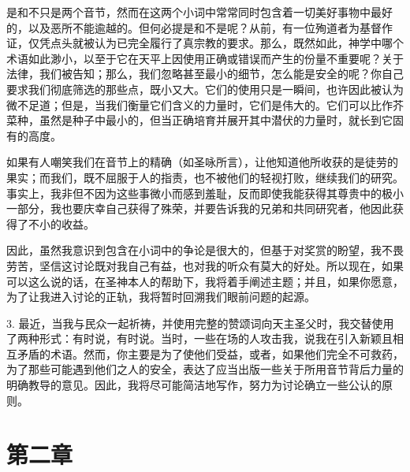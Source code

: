 是和不只是两个音节，然而在这两个小词中常常同时包含着一切美好事物中最好的，以及恶所不能逾越的。但何必提是和不是呢？从前，有一位殉道者为基督作证，仅凭点头就被认为已完全履行了真宗教的要求。那么，既然如此，神学中哪个术语如此渺小，以至于它在天平上因使用正确或错误而产生的份量不重要呢？关于法律，我们被告知；那么，我们忽略甚至最小的细节，怎么能是安全的呢？你自己要求我们彻底筛选的那些点，既小又大。它们的使用只是一瞬间，也许因此被认为微不足道；但是，当我们衡量它们含义的力量时，它们是伟大的。它们可以比作芥菜种，虽然是种子中最小的，但当正确培育并展开其中潜伏的力量时，就长到它固有的高度。\par

如果有人嘲笑我们在音节上的精确（如圣咏所言），让他知道他所收获的是徒劳的果实；而我们，既不屈服于人的指责，也不被他们的轻视打败，继续我们的研究。事实上，我非但不因为这些事微小而感到羞耻，反而即使我能获得其尊贵中的极小一部分，我也要庆幸自己获得了殊荣，并要告诉我的兄弟和共同研究者，他因此获得了不小的收益。\par

因此，虽然我意识到包含在小词中的争论是很大的，但基于对奖赏的盼望，我不畏劳苦，坚信这讨论既对我自己有益，也对我的听众有莫大的好处。所以现在，如果可以这么说的话，在圣神本人的帮助下，我将着手阐述主题；并且，如果你愿意，为了让我进入讨论的正轨，我将暂时回溯我们眼前问题的起源。\par

3. 最近，当我与民众一起祈祷，并使用完整的赞颂词向天主圣父时，我交替使用了两种形式：有时说，有时说。当时，一些在场的人攻击我，说我在引入新颖且相互矛盾的术语。然而，你主要是为了使他们受益，或者，如果他们完全不可救药，为了那些可能遇到他们之人的安全，表达了应当出版一些关于所用音节背后力量的明确教导的意见。因此，我将尽可能简洁地写作，努力为讨论确立一些公认的原则。\par


\section{第二章}

\par

